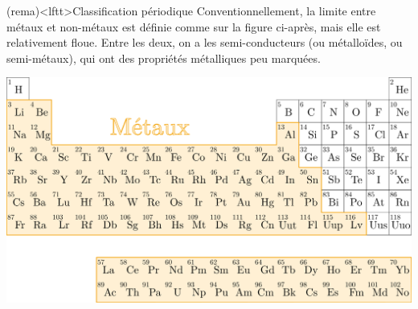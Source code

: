 \documentclass[../../main/main.tex]{subfiles}
\begin{document}
\begin{tcb}(rema)<lftt>{Classification périodique}
	Conventionnellement, la limite entre métaux et non-métaux est définie comme
	sur la figure ci-après, mais elle est relativement floue. Entre les deux, on
	a les semi-conducteurs (ou métalloïdes, ou semi-métaux), qui ont des
	propriétés métalliques peu marquées.
	\begin{center}
		\includegraphics[scale=1]{metaux}
	\end{center}
\end{tcb}

%
\end{document}
